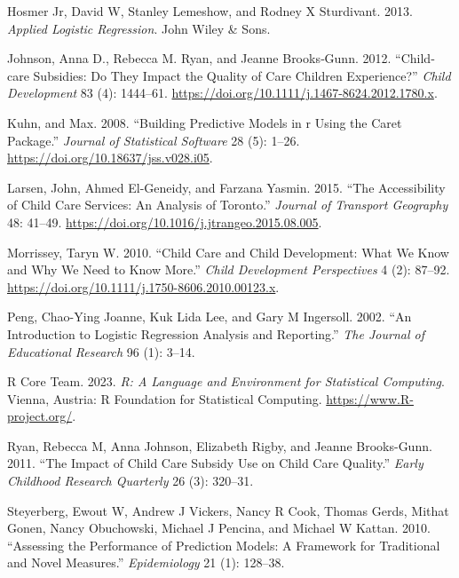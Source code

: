 \documentclass[
  letterpaper,
  DIV=11,
  numbers=noendperiod]{scrartcl}
\newlength{\cslhangindent}
\newenvironment{CSLReferences}[2] %
 {\begin{list}{}{%
  \setlength{\itemindent}{0pt}
  \setlength{\leftmargin}{0pt}
  \setlength{\parsep}{0pt}
  \ifodd #1
   \setlength{\leftmargin}{\cslhangindent}
   \setlength{\itemindent}{-1\cslhangindent}
  \fi
  \setlength{\itemsep}{#2\baselineskip}}}
 {\end{list}}
\begin{document}
\begin{CSLReferences}{1}{0}
Hosmer Jr, David W, Stanley Lemeshow, and Rodney X Sturdivant. 2013.
\emph{Applied Logistic Regression}. John Wiley \& Sons.

Johnson, Anna D., Rebecca M. Ryan, and Jeanne Brooks‐Gunn. 2012.
{``Child‐care Subsidies: Do They Impact the Quality of Care Children
Experience?''} \emph{Child Development} 83 (4): 1444--61.
\url{https://doi.org/10.1111/j.1467-8624.2012.1780.x}.

Kuhn, and Max. 2008. {``Building Predictive Models in r Using the Caret
Package.''} \emph{Journal of Statistical Software} 28 (5): 1--26.
\url{https://doi.org/10.18637/jss.v028.i05}.

Larsen, John, Ahmed El-Geneidy, and Farzana Yasmin. 2015. {``The
Accessibility of Child Care Services: An Analysis of Toronto.''}
\emph{Journal of Transport Geography} 48: 41--49.
\url{https://doi.org/10.1016/j.jtrangeo.2015.08.005}.

Morrissey, Taryn W. 2010. {``Child Care and Child Development: What We
Know and Why We Need to Know More.''} \emph{Child Development
Perspectives} 4 (2): 87--92.
\url{https://doi.org/10.1111/j.1750-8606.2010.00123.x}.

Peng, Chao-Ying Joanne, Kuk Lida Lee, and Gary M Ingersoll. 2002. {``An
Introduction to Logistic Regression Analysis and Reporting.''} \emph{The
Journal of Educational Research} 96 (1): 3--14.

R Core Team. 2023. \emph{{R: A Language and Environment for Statistical
Computing}}. Vienna, Austria: R Foundation for Statistical Computing.
\url{https://www.R-project.org/}.

Ryan, Rebecca M, Anna Johnson, Elizabeth Rigby, and Jeanne Brooks-Gunn.
2011. {``The Impact of Child Care Subsidy Use on Child Care Quality.''}
\emph{Early Childhood Research Quarterly} 26 (3): 320--31.

Steyerberg, Ewout W, Andrew J Vickers, Nancy R Cook, Thomas Gerds,
Mithat Gonen, Nancy Obuchowski, Michael J Pencina, and Michael W Kattan.
2010. {``Assessing the Performance of Prediction Models: A Framework for
Traditional and Novel Measures.''} \emph{Epidemiology} 21 (1): 128--38.


\end{CSLReferences}
\end{document}
